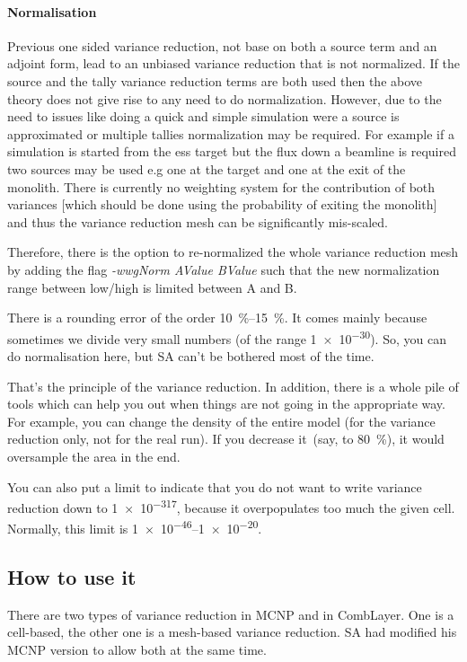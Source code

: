 \paragraph{Normalisation}

Previous one sided variance reduction, not base on both a source term
and an adjoint form, lead to an unbiased variance reduction that is
not normalized. If the source and the tally variance reduction terms
are both used then the above theory does not give rise to any need to
do normalization. However, due to the need to issues like doing a
quick and simple simulation were a source is approximated or multiple
tallies normalization may be required. For example if a simulation is
started from the ess target but the flux down a beamline is required
two sources may be used e.g one at the target and one at the exit of
the monolith. There is currently no weighting system for the
contribution of both variances [which should be done using the
  probability of exiting the monolith] and thus the variance reduction
mesh can be significantly mis-scaled.

Therefore, there is the option to re-normalized the whole variance reduction mesh by adding the flag
{\it -wwgNorm AValue BValue} such that the new normalization range between low/high is limited between A and B.


There is a rounding error of the order \SIrange{10}{15}{\percent}.
It comes mainly because sometimes we divide very small numbers (of the range \num[retain-unity-mantissa=false]{1e-30}). So, you can do normalisation here, but
SA can't be bothered most of the time.

\bigskip

That's the principle of the variance reduction. In addition, there is a whole pile of tools which can help you out when things
are not going in the appropriate way.
For example, you can change the density of the entire model (for the variance reduction only, not for the real run).
If you decrease it~(say, to \SI{80}{\percent}), it would oversample the area in the end.

You can also put a limit to indicate that you do not want to write variance reduction down to \num[retain-unity-mantissa=false]{1e-317}, because it overpopulates too much the given cell. Normally, this limit is \numrange[retain-unity-mantissa=false]{1e-46}{1e-20}.


\subsection{How to use it}
There are two types of variance reduction in MCNP and in CombLayer.
One is a cell-based, the other one is a mesh-based variance reduction.
SA had modified his MCNP version to allow both at the same time.

